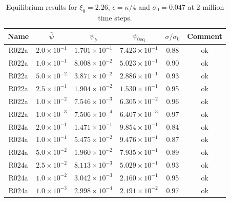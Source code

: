 \begin{table}
\begin{center}
\begin{tabular}{|c|c|c|c|c|c|}
\hline
Name & $\bar{\psi}$ & $\psi_b$ & $\psi_{0\mathrm{eq}}$
     & $\sigma / \sigma_0$  & Comment \\
\hline
R022a &  $2.0\times 10^{-1}$ & $1.701\times 10^{-1}$ & $7.423\times10^{-1}$
      & 0.88 & ok\\
R022a &  $1.0\times 10^{-1}$ & $8.008\times 10^{-2}$ & $5.023\times10^{-1}$
      & 0.90  & ok\\
R022a &  $5.0\times 10^{-2}$ & $3.871\times 10^{-2}$ & $2.886\times10^{-1}$
      & 0.93 & ok\\
R022a &  $2.5\times 10^{-1}$ & $1.904\times 10^{-2}$ & $1.530\times10^{-1}$
      & 0.95 & ok\\
R022a &  $1.0\times 10^{-2}$ & $7.546\times 10^{-3}$ & $6.305\times10^{-2}$
      & 0.96 & ok \\
R022a &  $1.0\times 10^{-3}$ & $7.506\times 10^{-4}$ & $6.407\times10^{-3}$
      & 0.97 & ok\\
\hline
R024a &  $2.0\times 10^{-1}$ & $1.471\times 10^{-1}$ & $9.854\times10^{-1}$
      & 0.84 & ok\\
R024a &  $1.0\times 10^{-1}$ & $5.475\times 10^{-2}$ & $9.476\times10^{-1}$
      & 0.87 & ok\\
R024a &  $5.0\times 10^{-2}$ & $1.960\times 10^{-2}$ & $7.935\times10^{-1}$
      & 0.89 & ok\\
R024a &  $2.5\times 10^{-2}$ & $8.113\times 10^{-3}$ & $5.029\times10^{-1}$
      &  0.93 & ok\\
R024a &  $1.0\times 10^{-2}$ & $3.042\times 10^{-3}$ & $2.160\times10^{-1}$
      &  0.95 & ok\\
R024a &  $1.0\times 10^{-3}$ & $2.998\times 10^{-4}$ & $2.191\times10^{-2}$
      &  0.97 & ok\\
\hline
\end{tabular}
\label{table:xi226a}
\caption{Equilibrium results for $\xi_0 = 2.26$, $\epsilon = \kappa/4$
and $\sigma_0 = 0.047$ at 2 million time steps.}
\end{center}
\end{table}





